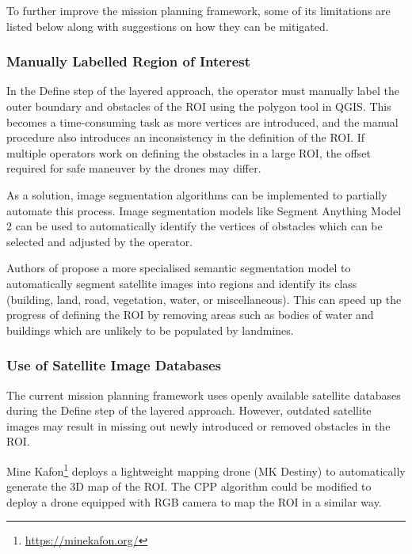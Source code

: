 To further improve the mission planning framework, some of its limitations are listed below along with suggestions on how they can be mitigated. 

\subsubsection{Manually Labelled Region of Interest}

In the Define step of the layered approach, the operator must manually label the outer boundary and obstacles of the \gls{ROI} using the polygon tool in \gls{QGIS}. This becomes a time-consuming task as more vertices are introduced, and the manual procedure also introduces an inconsistency in the definition of the \gls{ROI}. If multiple operators work on defining the obstacles in a large \gls{ROI}, the offset required for safe maneuver by the drones may differ. 

As a solution, image segmentation algorithms can be implemented to partially automate this process. Image segmentation models like Segment Anything Model 2 \cite{ravi2024sam2} can be used to automatically identify the vertices of obstacles which can be selected and adjusted by the operator. 

Authors of \cite{patil2022segment} propose a more specialised semantic segmentation model to automatically segment satellite images into regions and identify its class (building, land, road, vegetation, water, or miscellaneous). This can speed up the progress of defining the \gls{ROI} by removing areas such as bodies of water and buildings which are unlikely to be populated by landmines. 

\subsubsection{Use of Satellite Image Databases}
\label{sec:msp_satellite_database_limitation}

The current mission planning framework uses openly available satellite databases during the Define step of the layered approach. However, outdated satellite images may result in missing out newly introduced or removed obstacles in the \gls{ROI}. 

Mine Kafon\footnote{\url{https://minekafon.org/}} deploys a lightweight mapping drone (MK Destiny) to automatically generate the 3D map of the \gls{ROI}. The \gls{CPP} algorithm could be modified to deploy a drone equipped with RGB camera to map the \gls{ROI} in a similar way.  

